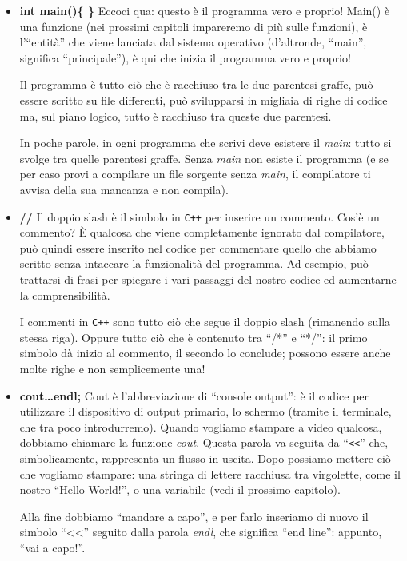 \begin{itemize}
\item\textbf{int main()\{ \}} Eccoci qua: questo è il programma vero e proprio! Main() è una funzione (nei prossimi capitoli impareremo di più sulle funzioni), è l'``entità'' che viene lanciata dal sistema operativo (d'altronde, ``main'', significa ``principale''), è qui che inizia il programma vero e proprio!

Il programma è tutto ciò che è racchiuso tra le due parentesi graffe, può essere scritto su file differenti, può svilupparsi in migliaia di righe di codice ma, sul piano logico, tutto è racchiuso tra queste due parentesi. 

In poche parole, in ogni programma che scrivi deve esistere il \emph{main}: tutto si svolge tra quelle parentesi graffe. Senza \emph{main} non esiste il programma (e se per caso provi a compilare un file sorgente senza \emph{main}, il compilatore ti avvisa della sua mancanza e non compila).

\item\textbf{//} Il doppio slash è il simbolo in \verb|C++| per inserire un commento. Cos'è un commento? \`E qualcosa che viene completamente ignorato dal compilatore, può quindi essere inserito nel codice per commentare quello che abbiamo scritto senza intaccare la funzionalità del programma. Ad esempio, può trattarsi di frasi per spiegare i vari passaggi del nostro codice ed aumentarne la comprensibilità. 

I commenti in \verb|C++| sono tutto ciò che segue il doppio slash (rimanendo sulla stessa riga). Oppure tutto ciò che è contenuto tra ``/*'' e ``*/'': il primo simbolo dà inizio al commento, il secondo lo conclude; possono essere anche molte righe e non semplicemente una!

\item\textbf{cout\ldots endl;} Cout è l'abbreviazione di ``console output'': è il codice per utilizzare il dispositivo di output primario, lo schermo (tramite il terminale, che tra poco introdurremo). Quando vogliamo stampare a video qualcosa, dobbiamo chiamare la funzione \emph{cout}. Questa parola va seguita da ``\verb|<<|'' che,	 simbolicamente, rappresenta un flusso in uscita. Dopo possiamo mettere ciò che vogliamo stampare: una stringa di lettere racchiusa tra virgolette, come il nostro ``Hello World!'', o una variabile (vedi il prossimo capitolo). 

Alla fine dobbiamo ``mandare a capo'',  e per farlo inseriamo di nuovo il simbolo ``<<'' seguito dalla parola \emph{endl}, che significa ``end line'': appunto, ``vai a capo!''.
	

\end{itemize}
